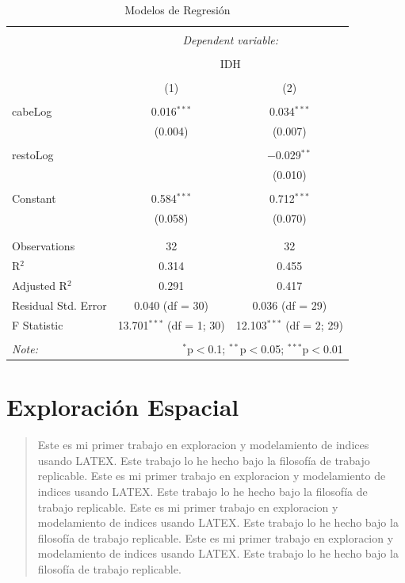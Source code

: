 \documentclass{article}
\begin{document}
\centering
\begin{table}[!htbp] \centering 
  \caption{Modelos de Regresión} 
  \label{regresiones} 
\begin{tabular}{@{\extracolsep{5pt}}lcc} 
\\[-1.8ex]\hline 
\hline \\[-1.8ex] 
 & \multicolumn{2}{c}{\textit{Dependent variable:}} \\ 
\cline{2-3} 
\\[-1.8ex] & \multicolumn{2}{c}{IDH} \\ 
\\[-1.8ex] & (1) & (2)\\ 
\hline \\[-1.8ex] 
 cabeLog & 0.016$^{***}$ & 0.034$^{***}$ \\ 
  & (0.004) & (0.007) \\ 
  & & \\ 
 restoLog &  & $-$0.029$^{**}$ \\ 
  &  & (0.010) \\ 
  & & \\ 
 Constant & 0.584$^{***}$ & 0.712$^{***}$ \\ 
  & (0.058) & (0.070) \\ 
  & & \\ 
\hline \\[-1.8ex] 
Observations & 32 & 32 \\ 
R$^{2}$ & 0.314 & 0.455 \\ 
Adjusted R$^{2}$ & 0.291 & 0.417 \\ 
Residual Std. Error & 0.040 (df = 30) & 0.036 (df = 29) \\ 
F Statistic & 13.701$^{***}$ (df = 1; 30) & 12.103$^{***}$ (df = 2; 29) \\ 
\hline 
\hline \\[-1.8ex] 
\textit{Note:}  & \multicolumn{2}{r}{$^{*}$p$<$0.1; $^{**}$p$<$0.05; $^{***}$p$<$0.01} \\ 
\end{tabular} 
\end{table} 


\section{Exploración Espacial}\label{espacial}

\begin{abstract}
Este es mi primer trabajo en exploracion y modelamiento de indices usando LATEX. Este trabajo lo he hecho bajo la filosofía de trabajo replicable. Este es mi primer trabajo en exploracion y modelamiento de indices usando LATEX. Este trabajo lo he hecho bajo la filosofía de trabajo replicable. Este es mi primer trabajo en exploracion y modelamiento de indices usando LATEX. Este trabajo lo he hecho bajo la filosofía de trabajo replicable. Este es mi primer trabajo en exploracion y modelamiento de indices usando LATEX. Este trabajo lo he hecho bajo la filosofía de trabajo replicable.
\end{abstract}
\end{document}
